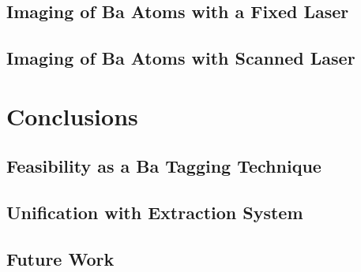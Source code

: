 \documentclass[doctor]{thesis} %
\begin{document}
\section{Imaging of Ba Atoms with a Fixed Laser}
\section{Imaging of Ba Atoms with Scanned Laser}

\chapter{Conclusions}
\label{chap:conclusions}

\section{Feasibility as a Ba Tagging Technique}
\section{Unification with Extraction System}
\section{Future Work}





\end{document}

